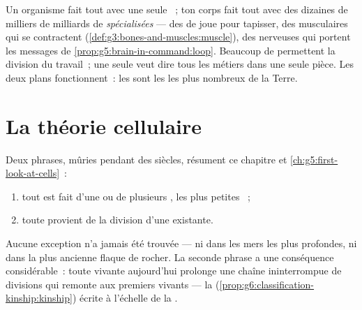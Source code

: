 \begin{remark}\label{rem:g6:cell-unit-of-life:twoways}
Un organisme  fait tout avec une seule ~; ton
corps fait tout avec des dizaines de milliers de milliards de
 \emph{spécialisées} --- des  de joue pour tapisser,
des  musculaires qui se contractent
(\cref{def:g3:bones-and-muscles:muscle}), des  nerveuses qui
portent les messages de \cref{prop:g5:brain-in-command:loop}.
Beaucoup de  permettent la division du travail~; une seule
 veut dire tous les métiers dans une seule pièce. Les deux
plans fonctionnent~: les  sont les  les
plus nombreux de la Terre.
\end{remark}

\section{La théorie cellulaire}

\begin{proposition}\label{prop:g6:cell-unit-of-life:theory}
Deux phrases, mûries pendant des siècles, résument ce chapitre et
\cref{ch:g5:first-look-at-cells}~:
\begin{enumerate}
  \item tout  est fait d'une ou de plusieurs ,
        les plus petites ~;
  \item toute  provient de la division d'une 
        existante.
\end{enumerate}
Aucune exception n'a jamais été trouvée --- ni dans les mers les
plus profondes, ni dans la plus ancienne flaque de rocher. La
seconde phrase a une conséquence considérable~: toute 
vivante aujourd'hui prolonge une chaîne ininterrompue de divisions
qui remonte aux premiers vivants --- la 
(\cref{prop:g6:classification-kinship:kinship}) écrite à l'échelle
de la .
\end{proposition}
\admitted

